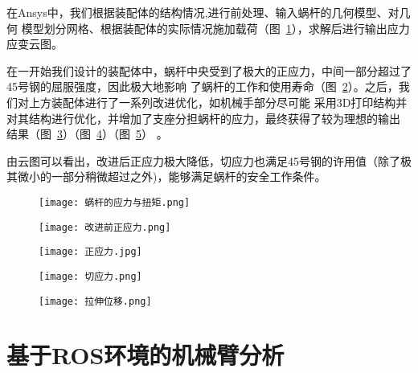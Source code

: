 {  {\songti 在Ansys中，我们根据装配体的结构情况,进行前处理、输入蜗杆的几何模型、对几何
  模型划分网格、根据装配体的实际情况施加载荷（图~\ref{fig:蜗杆的应力与扭矩}），求解后进行输出应力应变云图。}

  {\songti 在一开始我们设计的装配体中，蜗杆中央受到了极大的正应力，中间一部分超过了45号钢的屈服强度，因此极大地影响
  了蜗杆的工作和使用寿命（图~\ref{fig:改进前正应力}）。之后，我们对上方装配体进行了一系列改进优化，如机械手部分尽可能
  采用3D打印结构并对其结构进行优化，并增加了支座分担蜗杆的应力，最终获得了较为理想的输出
  结果（图~\ref{fig:正应力}）（图~\ref{fig:切应力}）（图~\ref{fig:拉伸位移}）} 。
   
  {\songti 由云图可以看出，改进后正应力极大降低，切应力也满足45号钢的许用值（除了极其微小的一部分稍微超过之外)，能够满足蜗杆的安全工作条件。}
 
   

  \begin{figure}[!htp]
    \centering
    \texttt{[image: 蜗杆的应力与扭矩.png]}
    \label{fig:蜗杆的应力与扭矩}
  \end{figure}

  
  \begin{figure}[!htp]
    \centering
    \texttt{[image: 改进前正应力.png]}
    \label{fig:改进前正应力}
  \end{figure}

  
  \begin{figure}[!htp]
    \centering
    \texttt{[image: 正应力.jpg]}
    \label{fig:正应力}
  \end{figure}

  \begin{figure}[!htp]
    \centering
    \texttt{[image: 切应力.png]}
    \label{fig:切应力}
  \end{figure}

  \begin{figure}[!htp]
    \centering
    \texttt{[image: 拉伸位移.png]}
    \label{fig:拉伸位移}
  \end{figure}

  \newpage

\section{基于ROS环境的机械臂分析}

}
